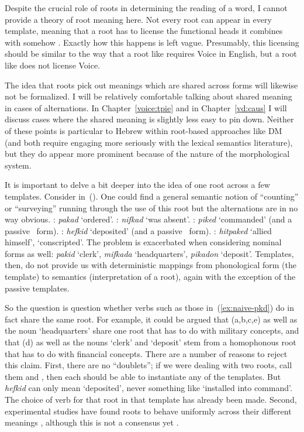 Despite the crucial role of roots in determining the reading of a word, I cannot provide a theory of root meaning here. Not every root can appear in every template, meaning that a root has to license the functional heads it combines with somehow \citep{harleynoyer00}. Exactly how this happens is left vague. Presumably, this licensing should be similar to the way that a root like  requires Voice in English, but a root like  does not license Voice.

The idea that roots pick out meanings which are shared across forms will likewise not be formalized. I will be relatively comfortable talking about shared meaning in cases of alternations. In Chapter~\ref{voice:tpie} and in Chapter~\ref{vd:caus} I will discuss cases where the shared meaning is slightly less easy to pin down. Neither of these points is particular to Hebrew within root-based approaches like DM (and both require engaging more seriously with the lexical semantics literature), but they do appear more prominent because of the nature of the morphological system.

It is important to delve a bit deeper into the idea of one root across a few templates. Consider  in~(\nextx).  One could find a general semantic notion of ``counting'' or ``surveying'' running through the use of this root but the alternations are in no way obvious. 
\pex\label{ex:naive-pkd}
  \a \tkal: \emph{pakad} `ordered'.
  \a \tnif: \emph{nifkad} `was absent'.
  \a \tpie: \emph{piked} `commanded' (and a passive \tpua~form).
  \a \thif: \emph{hefkid} `deposited' (and a passive \thuf~form).
  \a \thit: \emph{hitpaked} `allied himself', `conscripted'.
\xe
The problem is exacerbated when considering nominal forms as well: \emph{pakid} `clerk', \emph{mifkada} `headquarters', \emph{pikadon} `deposit'. Templates, then, do not provide us with deterministic mappings from phonological form (the template) to semantics (interpretation of a root), again with the exception of the passive templates.

So the question is question whether verbs such as those in~(\ref{ex:naive-pkd}) do in fact share the same root. For example, it could be argued that (\lastx a,b,c,e) as well as the noun `headquarters' share one root that has to do with military concepts, and that (\lastx d) as well as the nouns `clerk' and `deposit' stem from a homophonous root that has to do with financial concepts. There are a number of reasons to reject this claim. First, there are no ``doublets''; if we were dealing with two roots, call them  and , then each should be able to instantiate any of the templates. But \emph{hefkid} can only mean `deposited', never something like `installed into command'. The choice of verb for that root in that template has already been made. Second, experimental studies have found roots to behave uniformly across their different meanings \citep{deutsch16,deutschetal16,deutschkuperman18,kastneretal18}, although this is not a consensus yet \citep{fmdpmetal05jml,hellerbendavid15}.
		
